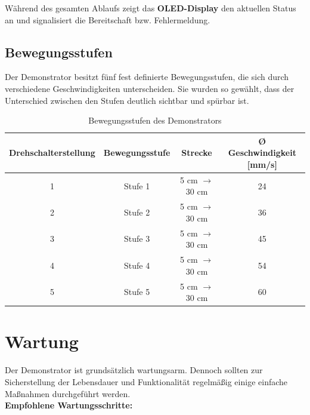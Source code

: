 \documentclass[a4paper,12pt,final]{report}
\begin{document}
\noindent
Während des gesamten Ablaufs zeigt das \textbf{OLED-Display} den aktuellen Status an und signalisiert die Bereitschaft bzw. Fehlermeldung.

\setlength{\leftskip}{0pt} %
\newpage

	\section{Bewegungsstufen}

		
		Der Demonstrator besitzt fünf fest definierte Bewegungsstufen, die sich durch verschiedene Geschwindigkeiten unterscheiden. Sie wurden so gewählt, dass der Unterschied zwischen den Stufen deutlich sichtbar und spürbar ist.\\
		
		\begin{table}[h]
			\centering
			\begin{tabular}{|c|c|c|c|}
				\hline
				\textbf{Drehschalterstellung} & \textbf{Bewegungsstufe} & \textbf{Strecke} & \textbf{Ø Geschwindigkeit [mm/s]} \\ \hline
				1 & Stufe 1 & 5 cm $\rightarrow$ 30 cm & 24 \\ \hline
				2 & Stufe 2 & 5 cm $\rightarrow$ 30 cm & 36 \\ \hline
				3 & Stufe 3 & 5 cm $\rightarrow$ 30 cm & 45 \\ \hline
				4 & Stufe 4 & 5 cm $\rightarrow$ 30 cm & 54 \\ \hline
				5 & Stufe 5 & 5 cm $\rightarrow$ 30 cm & 60 \\ \hline
			\end{tabular}
			\caption{Bewegungsstufen des Demonstrators}
			\label{tab:bewegungsstufen}
		\end{table}
		
		\vspace{0.5em}
	
\chapter{Wartung}


Der Demonstrator ist grundsätzlich wartungsarm. Dennoch sollten zur Sicherstellung der Lebensdauer und Funktionalität regelmäßig einige einfache Maßnahmen durchgeführt werden. \\[0.75cm]
 

\textbf{Empfohlene Wartungsschritte:}

\setlength{\leftskip}{1.5em} 
\end{document}
